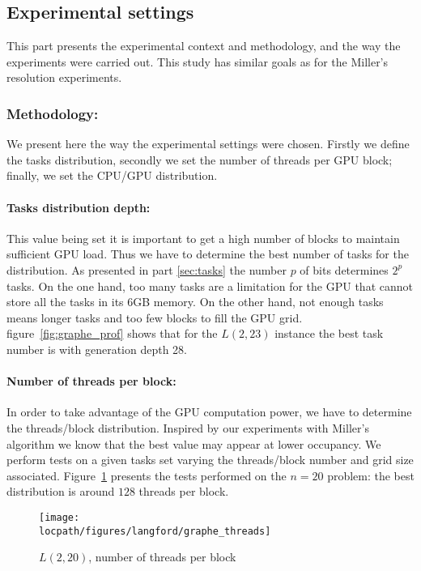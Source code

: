 \subsection{Experimental settings}
This part presents the experimental context and methodology, and the way the experiments were carried out.
This study has similar goals as for the Miller's resolution experiments.

\subsubsection{Methodology: }
We present here the way the experimental settings were chosen.
Firstly we define the tasks distribution, secondly we set the number of threads per GPU block; finally, we set the CPU/GPU distribution.

\paragraph{Tasks distribution depth: }
This value being set it is important to get a high number of blocks to maintain sufficient GPU load.
Thus we have to determine the best number of tasks for the distribution. As presented in part \ref{sec:tasks} the number $p$ of bits determines $2^p$ tasks. On the one hand, too many tasks are a limitation for the GPU that cannot store all the tasks in its 6GB memory. On the other hand, not enough tasks means longer tasks and too few blocks to fill the GPU grid. figure~\ref{fig:graphe_prof} shows that for the $L(2,23)$ instance the best task number is with generation depth 28.

\paragraph{Number of threads per block: }
In order to take advantage of the GPU computation power, we have to determine the threads/block distribution. Inspired by our experiments with Miller's algorithm we know that the best value may appear at lower occupancy. We perform tests on a given tasks set varying the threads/block number and grid size associated. 
Figure~\ref{fig:graphe_threads} presents the tests performed on the $n=20$ problem: the best distribution is around $128$ threads per block. 
\begin{figure}[t!]
\centering 
\texttt{[image: \\locpath/figures/langford/graphe\_threads]}
\caption{$L(2,20)$, number of threads per block}
\label{fig:graphe_threads}
\end{figure}

